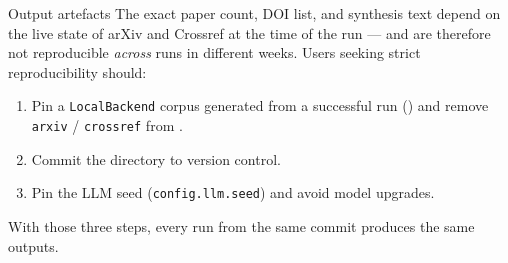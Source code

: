 \documentclass[
  ignorenonframetext,
]{beamer}
\providecommand{\tightlist}{%
  \setlength{\itemsep}{0pt}\setlength{\parskip}{0pt}}
\begin{document}
\begin{frame}{Output artefacts}
The exact paper count, DOI list, and synthesis text depend on the live
state of arXiv and Crossref at the time of the run --- and are therefore
not reproducible \emph{across} runs in different weeks. Users seeking
strict reproducibility should:

\begin{enumerate}
\tightlist
\item
  Pin a \texttt{LocalBackend} corpus generated from a successful run
  () and remove
  \texttt{arxiv} / \texttt{crossref} from
  .
\item
  Commit the  directory to version control.
\item
  Pin the LLM seed (\texttt{config.llm.seed}) and avoid model upgrades.
\end{enumerate}

With those three steps, every run from the same commit produces the same
outputs.
\end{frame}
\end{document}
